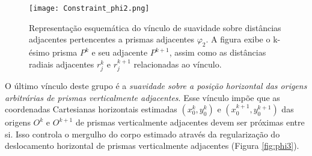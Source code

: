 \begin{figure}[!htb]
	\centering
	\texttt{[image: Constraint\_phi2.png]}
	\caption{Representação esquemática do vínculo de suavidade sobre distâncias adjacentes pertencentes a prismas adjacentes $\varphi_{2}$. A figura exibe o k-ésimo prisma $P^k$ e seu adjacente $P^{k+1}$, assim como as distâncias radiais adjacentes $r_j^k$ e $r_j^{k+1}$ relacionadas ao vínculo.}
	\label{fig:phi2}
\end{figure}

O último vínculo deste grupo é a \textit{suavidade sobre a posição horizontal das origens arbitrárias de prismas verticalmente adjacentes}. Esse vínculo impõe que as coordenadas Cartesianas horizontais estimadas $(x_{0}^{k}, y_{0}^{k})$ e $(x_{0}^{k+1}, y_{0}^{k+1})$ das origens $O^{k}$ e $O^{k+1}$ 
de prismas verticalmente adjacentes devem ser próximas entre si. Isso controla o mergulho do corpo estimado através da regularização do deslocamento horizontal de prismas verticalmente adjacentes (Figura \ref{fig:phi3}).

